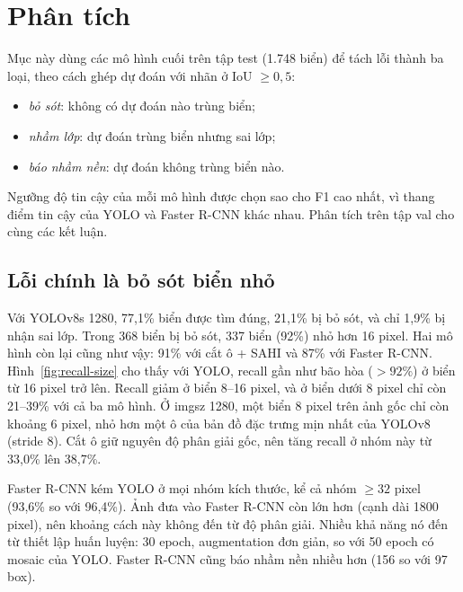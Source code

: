 
\section{Phân tích}
\label{sec:analysis}

Mục này dùng các mô hình cuối trên tập test (1.748 biển) để tách lỗi thành ba loại, theo cách ghép dự đoán với nhãn ở IoU $\geq 0{,}5$:
\begin{itemize}
\item \emph{bỏ sót}: không có dự đoán nào trùng biển;
\item \emph{nhầm lớp}: dự đoán trùng biển nhưng sai lớp;
\item \emph{báo nhầm nền}: dự đoán không trùng biển nào.
\end{itemize}
Ngưỡng độ tin cậy của mỗi mô hình được chọn sao cho F1 cao nhất, vì thang điểm tin cậy của YOLO và Faster R-CNN khác nhau. Phân tích trên tập val cho cùng các kết luận.

\subsection{Lỗi chính là bỏ sót biển nhỏ}
\label{sec:small}

Với YOLOv8s 1280, 77,1\% biển được tìm đúng, 21,1\% bị bỏ sót, và chỉ 1,9\% bị nhận sai lớp.
Trong 368 biển bị bỏ sót, 337 biển (92\%) nhỏ hơn 16 pixel. Hai mô hình còn lại cũng như vậy: 91\% với cắt ô + SAHI và 87\% với Faster R-CNN.
Hình~\ref{fig:recall-size} cho thấy với YOLO, recall gần như bão hòa ($> 92\%$) ở biển từ 16 pixel trở lên. Recall giảm ở biển 8--16 pixel, và ở biển dưới 8 pixel chỉ còn 21--39\% với cả ba mô hình.
Ở imgsz 1280, một biển 8 pixel trên ảnh gốc chỉ còn khoảng 6 pixel, nhỏ hơn một ô của bản đồ đặc trưng mịn nhất của YOLOv8 (stride 8). Cắt ô giữ nguyên độ phân giải gốc, nên tăng recall ở nhóm này từ 33,0\% lên 38,7\%.

Faster R-CNN kém YOLO ở mọi nhóm kích thước, kể cả nhóm $\geq 32$ pixel (93,6\% so với 96,4\%). Ảnh đưa vào Faster R-CNN còn lớn hơn (cạnh dài 1800 pixel), nên khoảng cách này không đến từ độ phân giải. Nhiều khả năng nó đến từ thiết lập huấn luyện: 30 epoch, augmentation đơn giản, so với 50 epoch có mosaic của YOLO. Faster R-CNN cũng báo nhầm nền nhiều hơn (156 so với 97 box).

